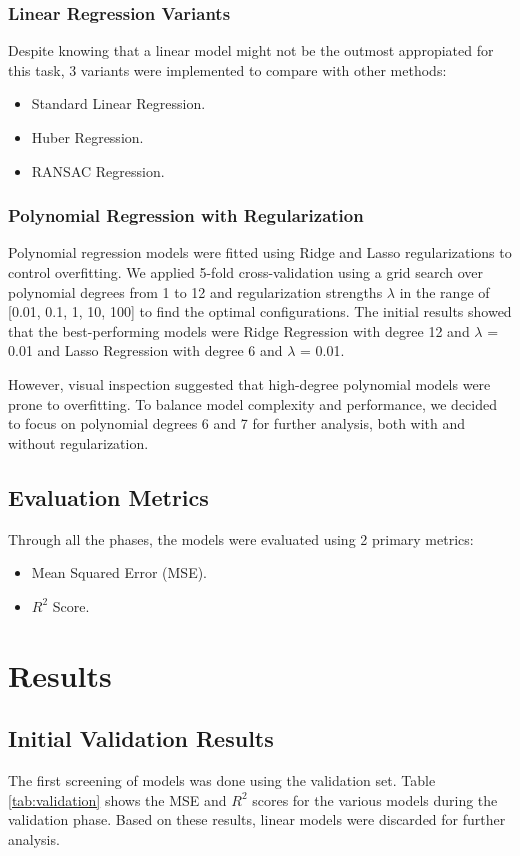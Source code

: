 \documentclass[twocolumn]{article}
\begin{document}
\subsubsection{Linear Regression Variants}
Despite knowing that a linear model might not be the outmost appropiated for this task, 3 variants were implemented
to compare with other methods:

\begin{itemize}
    \item Standard Linear Regression.
    \item Huber Regression.
    \item RANSAC Regression.
\end{itemize}

\subsubsection{Polynomial Regression with Regularization}
Polynomial regression models were fitted using Ridge and Lasso regularizations to 
control overfitting. We applied 5-fold cross-validation using a grid search over 
polynomial degrees from 1 to 12 and regularization strengths \(\lambda\) in the range of [0.01, 0.1, 1, 10, 100]
to find the optimal configurations. The initial results showed that the best-performing 
models were Ridge Regression with degree 12 and \(\lambda\) = 0.01 and 
Lasso Regression with degree 6 and \(\lambda\) = 0.01.

However, visual inspection suggested that high-degree polynomial models were prone to overfitting. To balance model complexity 
and performance, we decided to focus on polynomial degrees 6 and 7 for further analysis, 
both with and without regularization. 

\subsection{Evaluation Metrics}
Through all the phases, the models were evaluated using 2 primary metrics:
\begin{itemize}
    \item Mean Squared Error (MSE).
    \item \( R^2 \) Score.
\end{itemize}


\section{Results}

\subsection{Initial Validation Results}
The first screening of models was done using the validation set. Table \ref{tab:validation} shows the MSE and \( R^2 \) 
scores for the various models during the validation phase. Based on these results, linear models were discarded for further analysis.
\end{document}
